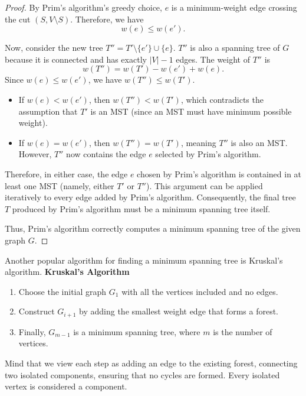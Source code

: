 \begin{proof}
By Prim's algorithm's greedy choice, $e$ is a minimum-weight edge crossing the cut $(S, V \setminus S)$. Therefore, we have
\[
w(e) \leq w(e').
\]

Now, consider the new tree $T'' = T' \setminus \{e'\} \cup \{e\}$. $T''$ is also a spanning tree of $G$ because it is connected and has exactly $|V|-1$ edges. The weight of $T''$ is
\[
w(T'') = w(T') - w(e') + w(e).
\]
Since $w(e) \leq w(e')$, we have $w(T'') \leq w(T')$.

\begin{itemize}
    \item If $w(e) < w(e')$, then $w(T'') < w(T')$, which contradicts the assumption that $T'$ is an MST (since an MST must have minimum possible weight).
    \item If $w(e) = w(e')$, then $w(T'') = w(T')$, meaning $T''$ is also an MST. However, $T''$ now contains the edge $e$ selected by Prim's algorithm.
\end{itemize}

Therefore, in either case, the edge $e$ chosen by Prim's algorithm is contained in at least one MST (namely, either $T'$ or $T''$). This argument can be applied iteratively to every edge added by Prim's algorithm. Consequently, the final tree $T$ produced by Prim's algorithm must be a minimum spanning tree itself.

Thus, Prim's algorithm correctly computes a minimum spanning tree of the given graph $G$.

\end{proof}

Another popular algorithm for finding a minimum spanning tree is Kruskal's algorithm.
\textbf{Kruskal's Algorithm}
\begin{enumerate}
    \item Choose the initial graph $G_1$ with all the vertices included and no edges.
    \item Construct $G_{i+1}$ by adding the smallest weight edge that forms a forest.
    \item Finally, $G_{m-1}$ is a minimum spanning tree, where $m$ is the number of vertices.
\end{enumerate}

Mind that we view each step as adding an edge to the existing forest, connecting two isolated components, ensuring that no cycles are formed. Every isolated vertex is considered a component.

